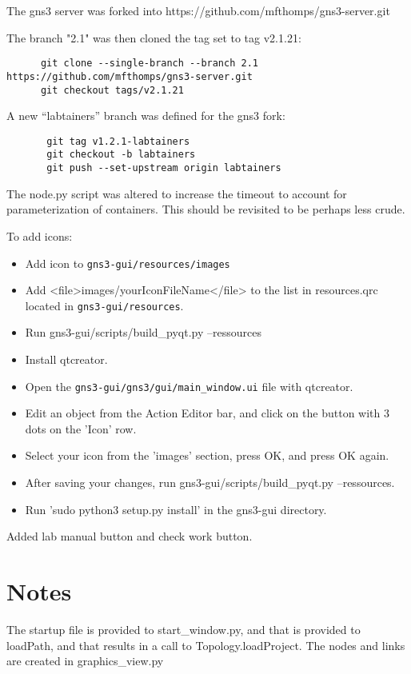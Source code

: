 \documentclass[12pt]{article}
\begin{document}
The gns3 server was forked into https://github.com/mfthomps/gns3-server.git

The branch "2.1" was then cloned the tag set to tag v2.1.21:
\small
\begin{verbatim}
      git clone --single-branch --branch 2.1 https://github.com/mfthomps/gns3-server.git
      git checkout tags/v2.1.21
\end{verbatim}

\normalsize
\noindent A new ``labtainers'' branch was defined for the gns3 fork:
\begin{verbatim}
       git tag v1.2.1-labtainers
       git checkout -b labtainers
       git push --set-upstream origin labtainers
\end{verbatim}

The node.py script was altered to increase the timeout to account for parameterization of
containers.  This should be revisited to be perhaps less crude.

\bigskip
To add icons: 
\begin{itemize}
	\item Add icon to {\tt gns3-gui/resources/images}
	\item Add  <file>images/yourIconFileName</file> to the list in resources.qrc located in {\tt gns3-gui/resources}.
	\item Run gns3-gui/scripts/build\_pyqt.py --ressources
	\item Install qtcreator. 
	\item Open the {\tt gns3-gui/gns3/gui/main\_window.ui} file with qtcreator.
	\item Edit an object from the Action Editor bar, and click on the button with 3 dots on the 'Icon' row. 
	\item Select your icon from the 'images' section, press OK, and press OK again.
	\item After saving your changes, run gns3-gui/scripts/build\_pyqt.py --ressources.
	\item Run 'sudo python3 setup.py install' in the gns3-gui directory.
\end{itemize}
Added lab manual button and check work button.
\section{Notes}
The startup file is provided to start\_window.py, and that is provided to loadPath, and that results in
a call to Topology.loadProject.  The nodes and links are created in graphics\_view.py
\end{document}
